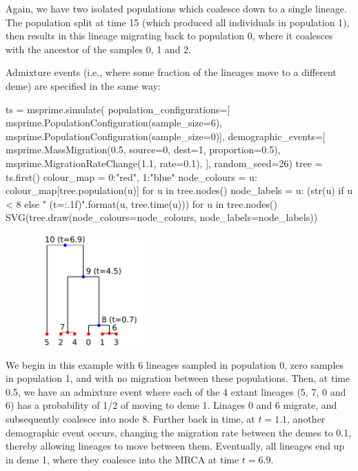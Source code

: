 \documentclass[graybox]{svmult}
\newcommand{\includenbimage}[1]{\begin{center}\texttt{[image: \#1]}\end{center}}
\begin{document}
Again, we have two isolated populations which coalesce down to a single
lineage. The population split at time 15 (which produced all individuals
in population 1), then results in this lineage migrating back to
population 0, where it coalesces with the ancestor of the samples 0, 1
and 2.

Admixture events (i.e., where some fraction of the lineages move to a
different deme) are specified in the same way:

\begin{pythoncode}
ts  = msprime.simulate(
    population_configurations=[
        msprime.PopulationConfiguration(sample_size=6),
        msprime.PopulationConfiguration(sample_size=0)],
    demographic_events=[
        msprime.MassMigration(0.5, source=0, dest=1, proportion=0.5),
        msprime.MigrationRateChange(1.1, rate=0.1),
    ],
    random_seed=26)
tree = ts.first()
colour_map = {0:"red", 1:"blue"}
node_colours = {u: colour_map[tree.population(u)] for u in tree.nodes()}
node_labels = {
    u: (str(u) if u < 8 else "{} (t={:.1f})".format(u, tree.time(u)))
    for u in tree.nodes()}
SVG(tree.draw(node_colours=node_colours, node_labels=node_labels))
\end{pythoncode}

\begin{figure}
  \begin{center}
    \includegraphics[width=0.38\textwidth]{images/simulations_39_0}
  \end{center}
\end{figure}

    We begin in this example with 6 lineages sampled in population 0, zero
samples in population 1, and with no migration between these
populations. Then, at time 0.5, we have an admixture event where each of
the 4 extant lineages (5, 7, 0 and 6) has a probability of 1/2 of moving
to deme 1. Linages 0 and 6 migrate, and subsequently coalesce into node
8. Further back in time, at \(t=1.1\), another demographic event occurs,
changing the migration rate between the demes to 0.1, thereby allowing
lineages to move between them. Eventually, all lineages end up in deme
1, where they coalesce into the MRCA at time \(t=6.9\).
\end{document}

